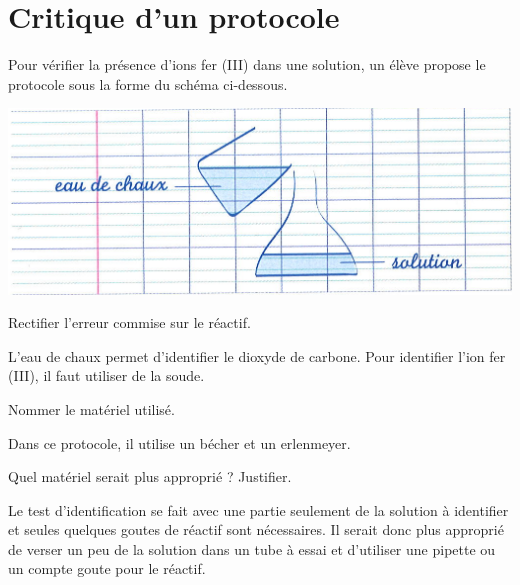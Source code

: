 \section{Critique d'un protocole}

Pour vérifier la présence d'ions fer (III)  dans une solution, un élève propose le protocole sous la forme du schéma ci-dessous.


\begin{center}
	\includegraphics[scale=1]{img/proto}
\end{center}
\begin{questions}
	\question Rectifier l'erreur commise sur le réactif.
	\begin{solution}
		L'eau de chaux permet d'identifier le dioxyde de carbone. Pour identifier l'ion fer (III), il faut utiliser de la soude.
	\end{solution}
	
	\question Nommer le matériel utilisé.
	\begin{solution}
		Dans ce protocole, il utilise un bécher et un erlenmeyer.
	\end{solution}
	
	\question Quel matériel serait plus approprié ? Justifier.
	\begin{solution}
		Le test d'identification se fait avec une partie seulement de la solution à identifier et seules quelques goutes de réactif sont nécessaires. Il serait donc plus approprié de verser un peu de la solution dans un tube à essai et d'utiliser une pipette ou un compte goute pour le réactif.
	\end{solution}

\end{questions}